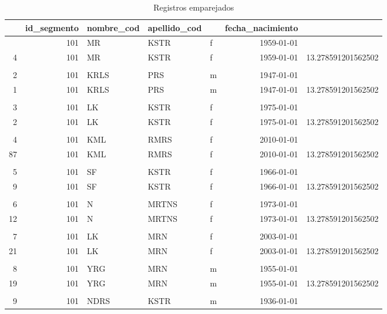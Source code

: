 \documentclass[
  12pt,
]{book}
\begin{document}
\begin{table}[t]
\caption*{
{\large Registros emparejados}
} 
\fontsize{12.0pt}{14.4pt}\selectfont
\begin{tabular*}{1\linewidth}{@{\extracolsep{\fill}}rrlllrr}
\toprule
{\bfseries \cellcolor[HTML]{F9F9F9}{id}} & id\_segmento & nombre\_cod & apellido\_cod & {\bfseries \cellcolor[HTML]{F9F9F9}{sexo}} & fecha\_nacimiento & {\bfseries \cellcolor[HTML]{F9F9F9}{Weight}} \\ 
\midrule\addlinespace[2.5pt]
 1 & 101 & MR & KSTR & f & 1959-01-01 &  \\ 
 4 & 101 & MR & KSTR & f & 1959-01-01 & 13.278591201562502 \\ 
 &  &  &  &  &  &  \\ 
 2 & 101 & KRLS & PRS & m & 1947-01-01 &  \\ 
 1 & 101 & KRLS & PRS & m & 1947-01-01 & 13.278591201562502 \\ 
 &  &  &  &  &  &  \\ 
 3 & 101 & LK & KSTR & f & 1975-01-01 &  \\ 
 2 & 101 & LK & KSTR & f & 1975-01-01 & 13.278591201562502 \\ 
 &  &  &  &  &  &  \\ 
 4 & 101 & KML & RMRS & f & 2010-01-01 &  \\ 
87 & 101 & KML & RMRS & f & 2010-01-01 & 13.278591201562502 \\ 
 &  &  &  &  &  &  \\ 
 5 & 101 & SF & KSTR & f & 1966-01-01 &  \\ 
 9 & 101 & SF & KSTR & f & 1966-01-01 & 13.278591201562502 \\ 
 &  &  &  &  &  &  \\ 
 6 & 101 & N & MRTNS & f & 1973-01-01 &  \\ 
12 & 101 & N & MRTNS & f & 1973-01-01 & 13.278591201562502 \\ 
 &  &  &  &  &  &  \\ 
 7 & 101 & LK & MRN & f & 2003-01-01 &  \\ 
21 & 101 & LK & MRN & f & 2003-01-01 & 13.278591201562502 \\ 
 &  &  &  &  &  &  \\ 
 8 & 101 & YRG & MRN & m & 1955-01-01 &  \\ 
19 & 101 & YRG & MRN & m & 1955-01-01 & 13.278591201562502 \\ 
 &  &  &  &  &  &  \\ 
 9 & 101 & NDRS & KSTR & m & 1936-01-01 &  \\ 

\end{tabular*}
\end{table}
\end{document}
